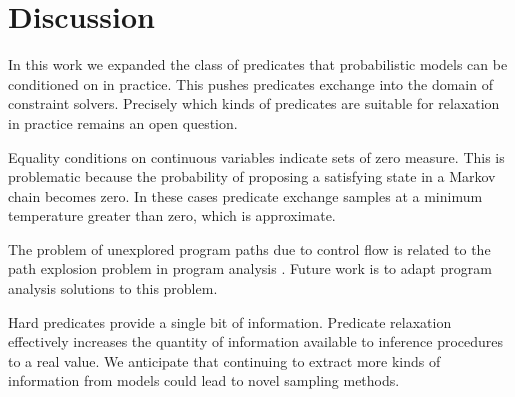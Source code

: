 \section{Discussion}
In this work we expanded the class of predicates that probabilistic models can be conditioned on in practice.
This pushes predicates exchange into the domain of constraint solvers.
Precisely which kinds of predicates are suitable for relaxation in practice remains an open question.

Equality conditions on continuous variables indicate sets of zero measure.
This is problematic because the probability of proposing a satisfying state in a Markov chain becomes zero.
In these cases predicate exchange samples at a minimum temperature greater than zero, which is approximate.

The problem of unexplored program paths due to control flow is related to the path explosion problem in program analysis \cite{cadar2008exe, sen2005cute}.
Future work is to adapt program analysis solutions to this problem.


Hard predicates provide a single bit of information.
Predicate relaxation effectively increases the quantity of information available to inference procedures to a real value.
We anticipate that continuing to extract more kinds of information from models could lead to novel sampling methods.




